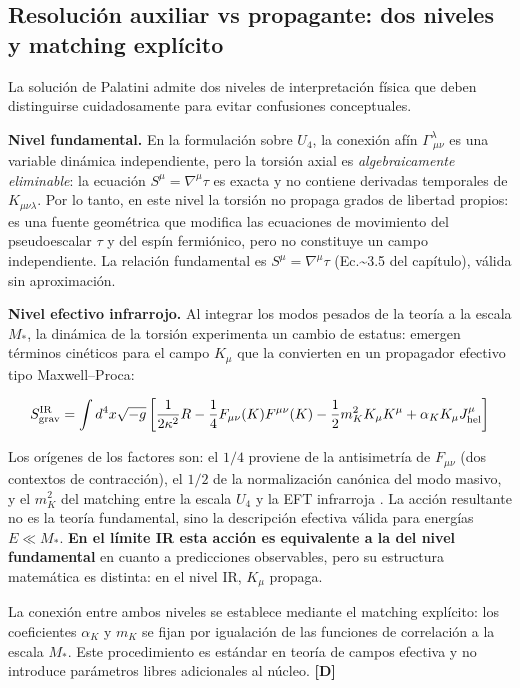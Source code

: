 ﻿\documentclass[11pt,letterpaper]{article}
\begin{document}
\subsection{Resolución auxiliar vs propagante: dos niveles y matching explícito}
La solución de Palatini admite dos niveles de interpretación física que deben distinguirse cuidadosamente para evitar confusiones conceptuales.

\textbf{Nivel fundamental.} En la formulación sobre $U_4$, la conexión afín $\Gamma^\lambda_{\ \mu\nu}$ es una variable dinámica independiente, pero la torsión axial es \emph{algebraicamente eliminable}: la ecuación $S^\mu = \nabla^\mu\tau$ es exacta y no contiene derivadas temporales de $K_{\mu\nu\lambda}$. Por lo tanto, en este nivel la torsión no propaga grados de libertad propios: es una fuente geométrica que modifica las ecuaciones de movimiento del pseudoescalar $\tau$ y del espín fermiónico, pero no constituye un campo independiente. La relación fundamental es $S^\mu = \nabla^\mu\tau$ (Ec.\textasciitilde{}3.5 del capítulo), válida sin aproximación.

\textbf{Nivel efectivo infrarrojo.} Al integrar los modos pesados de la teoría a la escala $M_*$, la dinámica de la torsión experimenta un cambio de estatus: emergen términos cinéticos para el campo $K_\mu$ que la convierten en un propagador efectivo tipo Maxwell--Proca:

\begin{equation*}
  \resizebox{\ifdim\width>\linewidth \linewidth\else\width\fi}{!}{$\displaystyle S_{\text{grav}}^{\text{IR}} = \int d^4x\sqrt{-g}\left[\frac{1}{2\kappa^2}R - \frac{1}{4}F_{\mu\nu}(K)F^{\mu\nu}(K) - \frac{1}{2}m_K^2 K_\mu K^\mu + \alpha_K K_\mu J_{\text{hel}}^\mu\right]$}
\end{equation*}

Los orígenes de los factores son: el $1/4$ proviene de la antisimetría de $F_{\mu\nu}$ (dos contextos de contracción), el $1/2$ de la normalización canónica del modo masivo, y el $m_K^2$ del matching entre la escala $U_4$ y la EFT infrarroja \cite{Biswas2006,Modesto2012} \cite{Tomboulis2015}. La acción resultante no es la teoría fundamental, sino la descripción efectiva válida para energías $E \ll M_*$. \textbf{En el límite IR esta acción es equivalente a la del nivel fundamental} en cuanto a predicciones observables, pero su estructura matemática es distinta: en el nivel IR, $K_\mu$ propaga.

La conexión entre ambos niveles se establece mediante el matching explícito: los coeficientes $\alpha_K$ y $m_K$ se fijan por igualación de las funciones de correlación a la escala $M_*$. Este procedimiento es estándar en teoría de campos efectiva y no introduce parámetros libres adicionales al núcleo. \textbf{[D]}
\end{document}
